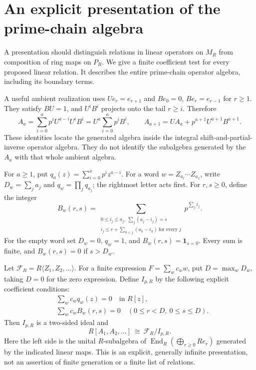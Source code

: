\section{An explicit presentation of the prime-chain algebra}
\label{v4-arith:ado:presentation}

A presentation should distinguish relations in linear operators on
\(M_R\) from composition of ring maps on \(P_R\). We give a finite
coefficient test for every proposed linear relation. It describes the
entire prime-chain operator algebra, including its boundary terms.

A useful ambient realization uses \(Ue_r=e_{r+1}\) and
\(Be_0=0\), \(Be_r=e_{r-1}\) for \(r\ge1\). They satisfy \(BU=1\),
and \(U^iB^i\) projects onto the tail \(r\ge i\). Therefore
\[
 A_a=\sum_{i=0}^a p^iU^{a-i}U^iB^i
     =U^a\sum_{i=0}^a p^iB^i,
 \qquad A_{a+1}=UA_a+p^{a+1}U^{a+1}B^{a+1}.
\]
These identities locate the generated algebra inside the integral
shift-and-partial-inverse operator algebra. They do not identify the
subalgebra generated by the \(A_a\) with that whole ambient algebra.


For \(a\ge1\), put \(q_a(z)=\sum_{i=0}^a p^i z^{a-i}\).
For a word \(w=Z_{a_\ell}\cdots Z_{a_1}\), write
\(D_w=\sum_j a_j\) and \(q_w=\prod_jq_{a_j}\); the rightmost letter
acts first. For \(r,s\ge0\), define the integer
\begin{equation}
\label{v4-arith:ado:word-coefficient}
 B_w(r,s)=
 \sum_{\substack{0\le i_j\le a_j,\ \sum_j(a_j-i_j)=s\\
 i_j\le r+\sum_{h<j}(a_h-i_h)\ \text{for every }j}}
 p^{\sum_j i_j}.
\end{equation}
For the empty word set \(D_w=0\), \(q_w=1\), and
\(B_w(r,s)=\mathbf1_{s=0}\). Every sum is finite, and
\(B_w(r,s)=0\) if \(s>D_w\).

\begin{theorem}
\label{v4-arith:ado:finite-presentation}
Let \(\mathcal F_R=R\langle Z_1,Z_2,\ldots\rangle\).
For a finite expression \(F=\sum_w c_w w\), put
\(D=\max_wD_w\), taking \(D=0\) for the zero expression.
Define \(I_{p,R}\) by the following explicit coefficient conditions:
\begin{align}
 &\sum_wc_wq_w(z)=0\quad\text{in }R[z],
 \label{v4-arith:ado:tail-relation}\\
 &\sum_wc_wB_w(r,s)=0\quad
 (0\le r<D,\ 0\le s\le D).
 \label{v4-arith:ado:boundary-relation}
\end{align}
Then \(I_{p,R}\) is a two-sided ideal and
\[
 R[A_1,A_2,\ldots]\ \cong\ \mathcal F_R/I_{p,R}.
\]
Here the left side is the unital \(R\)-subalgebra of
\(\operatorname{End}_R(\bigoplus_{r\ge0}Re_r)\) generated by the indicated
linear maps. This is an explicit, generally infinite presentation, not
an assertion of finite generation or a finite list of relations.
\end{theorem}

